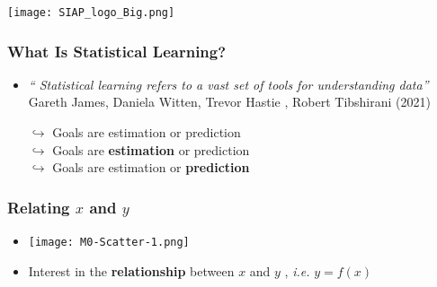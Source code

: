 \documentclass[xcolor=x11names,compress, aspectratio=169]{beamer}
\renewcommand{\(}{\begin{columns}}
\renewcommand{\)}{\end{columns}}
\newcommand{\<}[1]{\begin{column}{#1}}
\renewcommand{\>}{\end{column}}
\begin{document}
\begin{frame}

\hspace{1cm}


\hspace{2cm}
\begin{center}

\texttt{[image: SIAP\_logo\_Big.png]}

\end{center}
\end{frame}



\begin{frame} %
\frametitle{What Is Statistical Learning?}
\pause
\begin{itemize}[<+->]
\item[]
\begin{center}
\emph{`` Statistical learning refers to a vast set of tools for understanding data''}\\

{\scriptsize Gareth James,  Daniela Witten, Trevor Hastie ,  Robert Tibshirani (2021)}\\
\vspace{0.5cm}
\end{center}
\pause
    { $\hookrightarrow$ Goals are estimation or prediction \\ }
    { $\hookrightarrow$ Goals are \textbf{estimation} or prediction \\ }
    {$\hookrightarrow$ Goals are estimation or \textbf{prediction} \\ }
 \end{itemize}
\end{frame}


\begin{frame} %
\frametitle{Relating $x$ and $y$ }
 \begin{itemize}
  \item<+->[] \texttt{[image: M0-Scatter-1.png]}
  \item<+->[]  Interest in the \textbf{relationship} between $x$ and $y$ ,  \emph{i.e.} \textbf{$ y = f(x)$}
 \end{itemize}
\end{frame}
\end{document}

